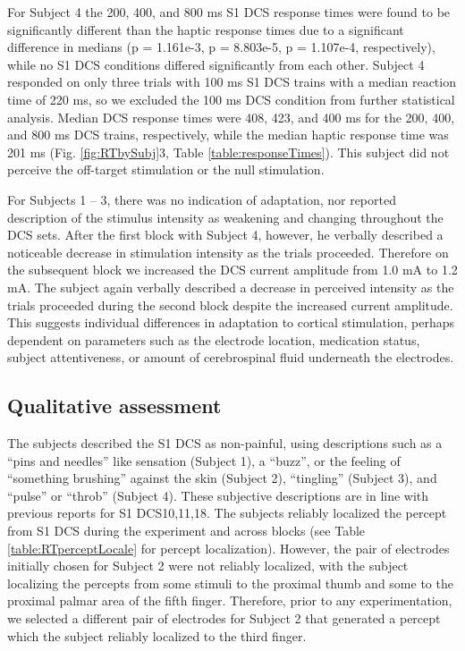 For Subject 4 the 200, 400, and 800 ms S1 DCS response times were found to be significantly different than the haptic response times due to a significant difference in medians (p = 1.161e-3, p = 8.803e-5, p = 1.107e-4, respectively), while no S1 DCS conditions differed significantly from each other. Subject 4 responded on only three trials with 100 ms S1 DCS trains with a median reaction time of 220 ms, so we excluded the 100 ms DCS condition from further statistical analysis. Median DCS response times were 408, 423, and 400 ms for the 200, 400, and 800 ms DCS trains, respectively, while the median haptic response time was 201 ms (Fig. \ref{fig:RTbySubj}3, Table \ref{table:responseTimes}). This subject did not perceive the off-target stimulation or the null stimulation.

For Subjects 1 – 3, there was no indication of adaptation, nor reported description of the stimulus intensity as weakening and changing throughout the DCS sets. After the first block with Subject 4, however, he verbally described a noticeable decrease in stimulation intensity as the trials proceeded. Therefore on the subsequent block we increased the DCS current amplitude from 1.0 mA to 1.2 mA. The subject again verbally described a decrease in perceived intensity as the trials proceeded during the second block despite the increased current amplitude. This suggests individual differences in adaptation to cortical stimulation, perhaps dependent on parameters such as the electrode location, medication status, subject attentiveness, or amount of cerebrospinal fluid underneath the electrodes.


\subsection{Qualitative assessment}

The subjects described the S1 DCS as non-painful, using descriptions such as a “pins and needles” like sensation (Subject 1), a “buzz”, or the feeling of “something brushing” against the skin (Subject 2), “tingling” (Subject 3), and “pulse” or “throb” (Subject 4). These subjective descriptions are in line with previous reports for S1 DCS10,11,18. The subjects reliably localized the percept from S1 DCS during the experiment and across blocks (see Table \ref{table:RTperceptLocale} for percept localization). However, the pair of electrodes initially chosen for Subject 2 were not reliably localized, with the subject localizing the percepts from some stimuli to the proximal thumb and some to the proximal palmar area of the fifth finger. Therefore, prior to any experimentation, we selected a different pair of electrodes for Subject 2 that generated a percept which the subject reliably localized to the third finger.

